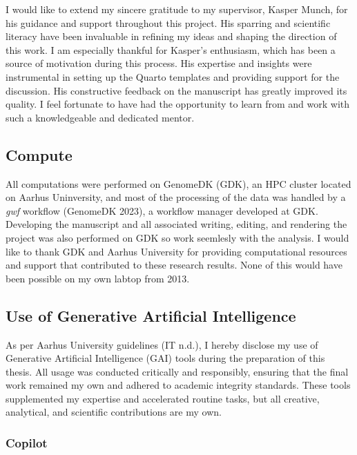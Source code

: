 \documentclass[
  11pt,
  a4paper,
]{scrbook}
\begin{document}
I would like to extend my sincere gratitude to my supervisor, Kasper
Munch, for his guidance and support throughout this project. His
sparring and scientific literacy have been invaluable in refining my
ideas and shaping the direction of this work. I am especially thankful
for Kasper's enthusiasm, which has been a source of motivation during
this process. His expertise and insights were instrumental in setting up
the Quarto templates and providing support for the discussion. His
constructive feedback on the manuscript has greatly improved its
quality. I feel fortunate to have had the opportunity to learn from and
work with such a knowledgeable and dedicated mentor.

\subsection*{Compute}\label{compute}

All computations were performed on GenomeDK (GDK), an HPC cluster
located on Aarhus Uninversity, and most of the processing of the data
was handled by a \emph{gwf} workflow (GenomeDK 2023), a workflow manager
developed at GDK. Developing the manuscript and all associated writing,
editing, and rendering the project was also performed on GDK so work
seemlesly with the analysis. I would like to thank GDK and Aarhus
University for providing computational resources and support that
contributed to these research results. None of this would have been
possible on my own labtop from 2013.

\subsection*{Use of Generative Artificial
Intelligence}\label{use-of-generative-artificial-intelligence}

As per Aarhus University guidelines (IT n.d.), I hereby disclose my use
of Generative Artificial Intelligence (GAI) tools during the preparation
of this thesis. All usage was conducted critically and responsibly,
ensuring that the final work remained my own and adhered to academic
integrity standards. These tools supplemented my expertise and
accelerated routine tasks, but all creative, analytical, and scientific
contributions are my own.

\subsubsection*{Copilot}\label{copilot}
\end{document}
